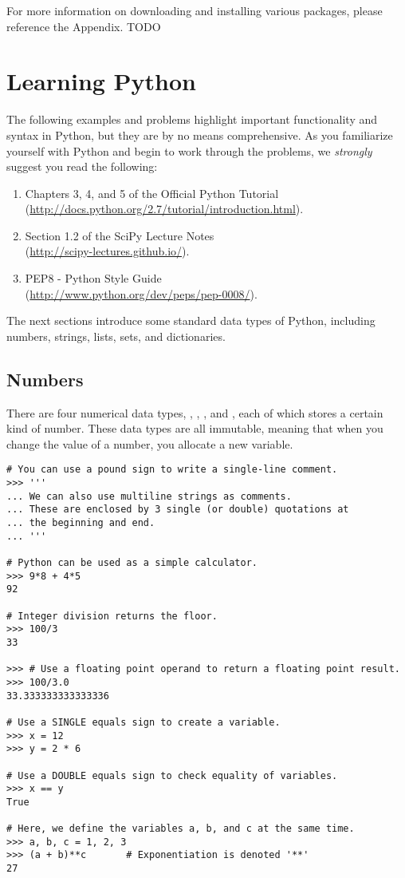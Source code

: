 For more information on downloading and installing various packages, please 
reference the Appendix. TODO


\section*{Learning Python}
The following examples and problems highlight important functionality and syntax in Python, but they are by no means comprehensive.  As you familiarize yourself with Python and begin to work through the problems, we \emph{strongly} suggest you read the following:
\begin{enumerate}
\item Chapters 3, 4, and 5 of the Official Python Tutorial \\
        (\url{http://docs.python.org/2.7/tutorial/introduction.html}).
\item Section 1.2 of the SciPy Lecture Notes \\
        (\url{http://scipy-lectures.github.io/}).
\item PEP8 - Python Style Guide \\
        (\url{http://www.python.org/dev/peps/pep-0008/}).
\end{enumerate}



The next sections introduce some standard data types of Python, including numbers, strings, lists, sets, and dictionaries. 

\subsection*{Numbers}
\begin{example} There are four numerical data types, , , 
, and , each of which stores a certain kind of number. These data types are all immutable, meaning that when you change the value of a number, you allocate a new variable.

\begin{lstlisting}
# You can use a pound sign to write a single-line comment.
>>> '''
... We can also use multiline strings as comments. 
... These are enclosed by 3 single (or double) quotations at 
... the beginning and end. 
... '''

# Python can be used as a simple calculator.
>>> 9*8 + 4*5
92

# Integer division returns the floor.
>>> 100/3
33

>>> # Use a floating point operand to return a floating point result.
>>> 100/3.0
33.333333333333336

# Use a SINGLE equals sign to create a variable.
>>> x = 12
>>> y = 2 * 6

# Use a DOUBLE equals sign to check equality of variables.
>>> x == y
True

# Here, we define the variables a, b, and c at the same time.
>>> a, b, c = 1, 2, 3
>>> (a + b)**c       # Exponentiation is denoted '**'
27
\end{lstlisting}
\end{example}

